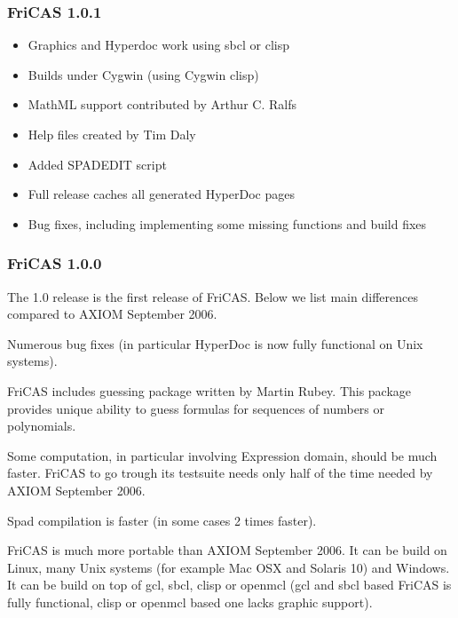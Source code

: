 \subsubsection{FriCAS 1.0.1}

\begin{itemize}
\item Graphics and Hyperdoc work using sbcl or clisp

\item Builds under Cygwin (using Cygwin clisp)

\item MathML support contributed by Arthur C. Ralfs

\item Help files created by Tim Daly

\item Added SPADEDIT script

\item Full release caches all generated HyperDoc pages

\item Bug fixes, including implementing some missing functions and
  build fixes
\end{itemize}

\subsubsection{FriCAS 1.0.0}

The 1.0 release is the first release of FriCAS. Below we list main
differences compared to AXIOM September 2006.

Numerous bug fixes (in particular HyperDoc is now fully functional on
Unix systems).

FriCAS includes guessing package written by Martin Rubey. This package
provides unique ability to guess formulas for sequences of numbers or
polynomials.

Some computation, in particular involving Expression domain, should be
much faster. FriCAS to go trough its testsuite needs only half of the
time needed by AXIOM September 2006.

Spad compilation is faster (in some cases 2 times faster).

FriCAS is much more portable than AXIOM September 2006. It can be
build on Linux, many Unix systems (for example Mac OSX and Solaris 10)
and Windows. It can be build on top of gcl, sbcl, clisp or openmcl
(gcl and sbcl based FriCAS is fully functional, clisp or openmcl based
one lacks graphic support).


